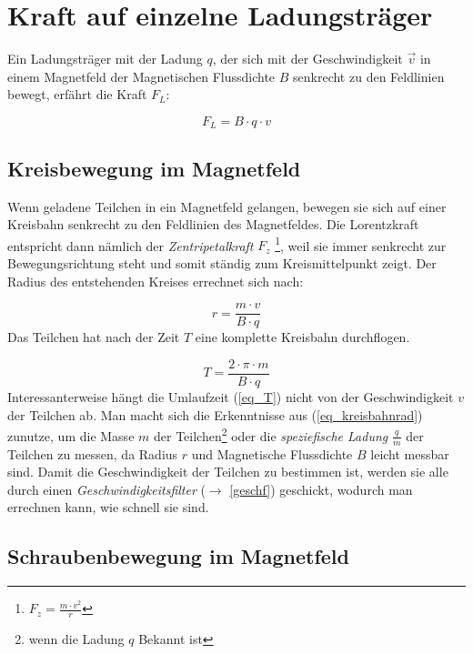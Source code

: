		\section{Kraft auf einzelne Ladungsträger}

Ein Ladungsträger mit der Ladung \(q\), der sich mit der Geschwindigkeit \(\vec{v}\) in einem Magnetfeld der Magnetischen Flussdichte \(B\) senkrecht zu den Feldlinien bewegt, erfährt die Kraft \(F_L\):
	
\begin{equation}
F_L = B \cdot q \cdot v
\end{equation}

		\subsection{Kreisbewegung im Magnetfeld}

Wenn geladene Teilchen in ein Magnetfeld gelangen, bewegen sie sich auf einer Kreisbahn senkrecht zu den Feldlinien des Magnetfeldes. Die Lorentzkraft entspricht dann nämlich der \textit{Zentripetalkraft} \(F_z\) \footnote{\(F_z = \frac{m \cdot v^2}{r}\)}, weil sie immer senkrecht zur Bewegungsrichtung steht und somit ständig zum Kreismittelpunkt zeigt. Der Radius des entstehenden Kreises errechnet sich nach:

\begin{equation}
r = \frac{m \cdot v}{B \cdot q}
\label{eq_kreisbahnrad}
\end{equation}
Das Teilchen hat nach der Zeit \(T\) eine komplette Kreisbahn durchflogen.

\begin{equation}
T = \frac{2 \cdot \pi \cdot m}{B \cdot q}
\label{eq_T}
\end{equation}
Interessanterweise hängt die Umlaufzeit (\ref{eq_T}) nicht von der Geschwindigkeit \(v\) der Teilchen ab. Man macht sich die Erkenntnisse aus (\ref{eq_kreisbahnrad}) zunutze, um die Masse \(m\) der Teilchen\footnote{wenn die Ladung \(q\) Bekannt ist} oder die \textit{speziefische Ladung} \(\frac{q}{m}\) der Teilchen zu messen, da Radius \(r\) und Magnetische Flussdichte \(B\) leicht messbar sind. Damit die Geschwindigkeit der Teilchen zu bestimmen ist, werden sie alle durch einen \textit{Geschwindigkeitsfilter} (\(\rightarrow\) \ref{geschf}) geschickt, wodurch man errechnen kann, wie schnell sie sind.

		\subsection{Schraubenbewegung im Magnetfeld}

